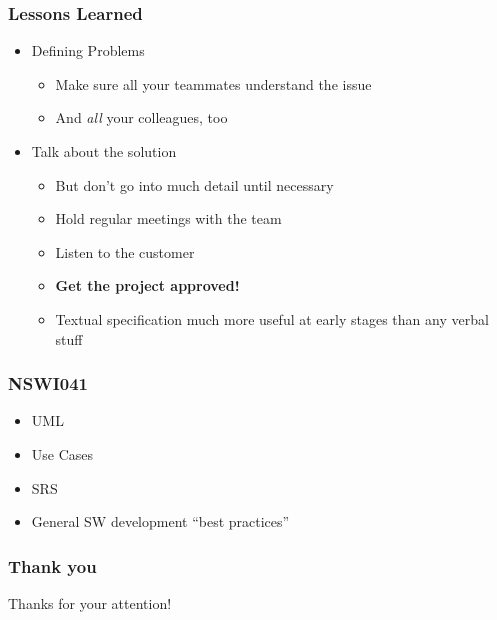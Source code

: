 \documentclass{beamer}
\begin{document}
\begin{frame}
    \frametitle{Lessons Learned}

\begin{itemize}
    \item Defining Problems
        \begin{itemize}
            \item Make sure all your teammates understand the issue
            \item And {\em all} your colleagues, too
        \end{itemize}
    \item Talk about the solution
        \begin{itemize}
            \item But don't go into much detail until necessary
            \item Hold regular meetings with the team
            \item Listen to the customer
            \item {\bf Get the project approved!}
            \item Textual specification much more useful at early stages than
                any verbal stuff
        \end{itemize}

\end{itemize}
\end{frame}

\begin{frame}
\frametitle{NSWI041}

\begin{itemize}
    \item UML
    \item Use Cases
    \item SRS
    \item General SW development ``best practices''
\end{itemize}

\end{frame}


\begin{frame}
\frametitle{Thank you}

\center
{\Large Thanks for your attention!}

\end{frame}
\end{document}
